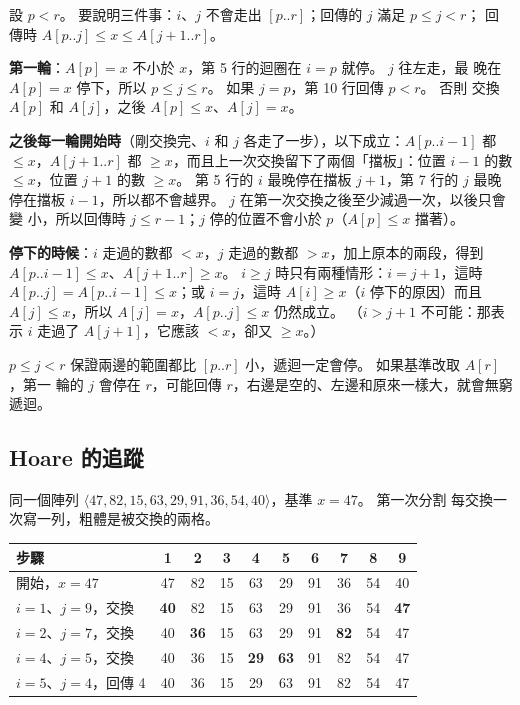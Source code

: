 \begin{whybox}
設 $p < r$。 要說明三件事：$i$、$j$ 不會走出 $[p..r]$；回傳的 $j$ 滿足 $p \le j < r$；
回傳時 $A[p..j] \le x \le A[j+1..r]$。

\textbf{第一輪}：$A[p] = x$ 不小於 $x$，第 5 行的迴圈在 $i = p$ 就停。 $j$ 往左走，最
晚在 $A[p] = x$ 停下，所以 $p \le j \le r$。 如果 $j = p$，第 10 行回傳 $p < r$。 否則
交換 $A[p]$ 和 $A[j]$，之後 $A[p] \le x$、$A[j] = x$。

\textbf{之後每一輪開始時}（剛交換完、$i$ 和 $j$ 各走了一步），以下成立：$A[p..i-1]$ 都
$\le x$，$A[j+1..r]$ 都 $\ge x$，而且上一次交換留下了兩個「擋板」：位置 $i - 1$ 的數
$\le x$，位置 $j + 1$ 的數 $\ge x$。 第 5 行的 $i$ 最晚停在擋板 $j + 1$，第 7 行的 $j$
最晚停在擋板 $i - 1$，所以都不會越界。 $j$ 在第一次交換之後至少減過一次，以後只會變
小，所以回傳時 $j \le r - 1$；$j$ 停的位置不會小於 $p$（$A[p] \le x$ 擋著）。

\textbf{停下的時候}：$i$ 走過的數都 $< x$，$j$ 走過的數都 $> x$，加上原本的兩段，得到
$A[p..i-1] \le x$、$A[j+1..r] \ge x$。 $i \ge j$ 時只有兩種情形：$i = j + 1$，這時
$A[p..j] = A[p..i-1] \le x$；或 $i = j$，這時 $A[i] \ge x$（$i$ 停下的原因）而且
$A[j] \le x$，所以 $A[j] = x$，$A[p..j] \le x$ 仍然成立。 （$i > j + 1$ 不可能：那表示
$i$ 走過了 $A[j+1]$，它應該 $< x$，卻又 $\ge x$。）

$p \le j < r$ 保證兩邊的範圍都比 $[p..r]$ 小，遞迴一定會停。 如果基準改取 $A[r]$，第一
輪的 $j$ 會停在 $r$，可能回傳 $r$，右邊是空的、左邊和原來一樣大，就會無窮遞迴。
\end{whybox}

\subsection{Hoare 的追蹤}

同一個陣列 $\langle 47, 82, 15, 63, 29, 91, 36, 54, 40 \rangle$，基準 $x = 47$。 第一次分割
每交換一次寫一列，粗體是被交換的兩格。

\begin{center}
\begin{tabular}{l*{9}{c}}
\toprule
步驟 & 1 & 2 & 3 & 4 & 5 & 6 & 7 & 8 & 9 \\
\midrule
開始，$x = 47$ & 47 & 82 & 15 & 63 & 29 & 91 & 36 & 54 & 40 \\
$i = 1$、$j = 9$，交換 & \textbf{40} & 82 & 15 & 63 & 29 & 91 & 36 & 54 & \textbf{47} \\
$i = 2$、$j = 7$，交換 & 40 & \textbf{36} & 15 & 63 & 29 & 91 & \textbf{82} & 54 & 47 \\
$i = 4$、$j = 5$，交換 & 40 & 36 & 15 & \textbf{29} & \textbf{63} & 91 & 82 & 54 & 47 \\
$i = 5$、$j = 4$，回傳 4 & 40 & 36 & 15 & 29 & 63 & 91 & 82 & 54 & 47 \\
\bottomrule
\end{tabular}
\end{center}

